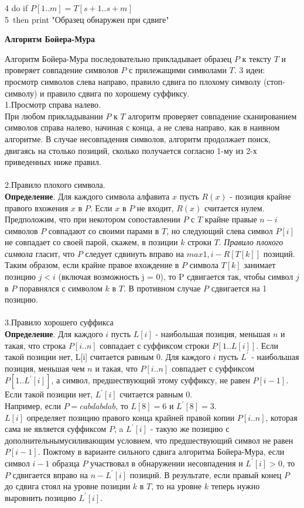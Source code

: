 \documentclass[a4paper,12pt]{article}
\begin{document}
4 \quad do if $P[1..m] = T[s + 1..s + m]$\\
5 \quad\,\quad then print "Образец обнаружен при сдвиге"\\
\begin{center}
\textbf{Алгоритм Бойера-Мура}
\end{center}
Алгоритм Бойера-Мура последовательно прикладывает образец $P$ к тексту $T$ и проверяет совпадение символов $P$ с прилежащими символами $T$. 3 идеи: просмотр символов слева направо, правило сдвига по плохому символу (стоп-символу) и правило сдвига по хорошему суффиксу. \\
1.Просмотр справа налево.\\
При любом прикладывании $P$ к $T$ алгоритм проверяет совпадение сканированием символов справа налево, начиная с конца, а не слева направо, как в наивном алгоритме.
В случае несовпадения символов, алгоритм продолжает поиск, двигаясь на столько позиций, сколько получается согласно 1-му из 2-х приведенных ниже правил. \\
\\
2.Правило плохого символа.\\
\textbf{Определение}. Для каждого символа алфавита $x$ пусть $R(x)$ - позиция крайне правого вхожения $x$ в $P$. Если $x$ в $P$ не входит, $R(x)$ считается нулем.\\
Предположим, что при некотором сопоставлении $P$ с $T$ крайне правые $n - i$ символов $P$ совпадают со своими парами в $T$, но следующий слева символ $P[i]$ не совпадает со своей парой, скажем, в позиции $k$ строки $T$. \textit{Правило плохого символа} гласит, что $P$ следует сдвинуть вправо на $max{1, i - R[T[k]]}$ позиций. Таким образом, если крайне правое вхождение в $P$ символа $T[k]$ занимает позицию $j < i$ (включая возможность j = 0), то P сдвигается так, чтобы символ $j$ в $P$ поравнялся с символом $k$ в $T$. В противном случае $P$ сдвигается на 1 позицию.\\
\\
3.Правило хорошего суффикса\\
\textbf{Определение}. Для каждого $i$ пусть $L[i]$ - наибольшая позиция, меньшая $n$ и такая, что строка $P[i..n]$ совпадает с суффиксом строки $P[1..L[i]]$. Если такой позиции нет, L[i] считается равным 0. Для каждого $i$ пусть $L^{\prime}$ - наибольшая позиция, меньшая чем $n$ и такая, что $P[i..n]$ совпадает с суффиксом $P[1..L^{\prime}[i]]$, а символ, предшествующий этому суффиксу, не равен $P[i - 1]$. Если такой позиции нет, $L^{\prime}[i]$ считается равным 0.\\ 
Например, если $P = cabdabdab$, то $L[8] = 6$ и $L^{\prime}[8] = 3$.\\
$L[i]$ определяет позицию правого конца крайней правой копии $P[i..n]$, которая сама не является суффиксом $P$, a $L^{\prime}[i]$ - такую же позицию с дополнительнымусиливающим условием, что предшествующий символ не равен $P[i - 1]$. Пожтому в варианте сильного сдвига алгоритма Бойера-Мура, если символ $i - 1$ образца $P$ участвовал в обнаружении несовпадения и $L^{\prime}[i] > 0$, то $P$ сдвигается вправо на $n - L^{\prime}[i]$ позиций. В результате, если правый конец $P$ до сдвига стоял на уровне позиции $k$ в $T$, то на уровне $k$ теперь нужно выровнить позицию $L^{\prime}[i]$.
\end{document}

